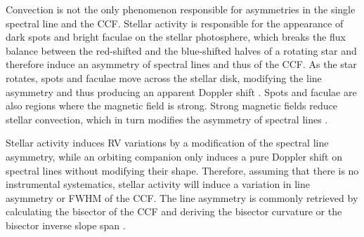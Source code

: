 \documentclass[11pt, oneside]{article}
\begin{document}
Convection is not the only phenomenon responsible for asymmetries in the single spectral line and the CCF. Stellar activity is responsible for the appearance of dark spots and bright faculae on the stellar photosphere, which breaks the flux balance between the red-shifted and the blue-shifted halves of a rotating star and therefore induce an asymmetry of spectral lines and thus of the CCF. As the star rotates, spots and faculae move across the stellar disk, modifying the line asymmetry and thus producing an apparent Doppler shift \citep{Saar-1997b,Hatzes-2002,Kurster2003,Desort-2007,Lagrange-2010,Boisse-2012b}. Spots and faculae are also regions where the magnetic field is strong. Strong magnetic fields reduce stellar convection, which in turn modifies the asymmetry of spectral lines \citep[][]{Cavallini-1985a,Dravins-1981,Lindegren-2003,Meunier-2010a,Dumusque-2014b}.

Stellar activity induces RV variations by a modification of the spectral line asymmetry, while an orbiting companion only induces a pure Doppler shift on spectral lines without modifying their shape.
Therefore, assuming that there is no instrumental systematics, stellar activity will induce a variation in line asymmetry or FWHM of the CCF. The line asymmetry is commonly retrieved by calculating the bisector of the CCF \citep[][]{Voigt1956} and deriving the bisector curvature \citep[][]{Hatzes1996} or the bisector inverse slope span \citep[BIS SPAN,][]{Queloz-2001}. 
\end{document}
